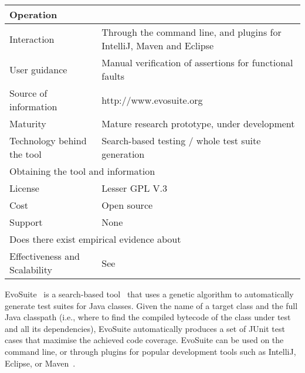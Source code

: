 \documentclass[10pt,conference]{IEEEtran}
\newcommand{\EVOSUITE}{{\sc EvoSuite}\xspace}
\begin{document}
\begin{table}[!h]
{\begin{tabular}{|l|p{5cm}|}
  \hline
  \multicolumn{2}{|l|}{Operation} \\
  \hline
  Interaction &  Through the command line, and plugins for IntelliJ, Maven and Eclipse\\
  User guidance &  Manual verification of assertions for functional faults\\
  Source of information &  http://www.evosuite.org \\
  Maturity&  Mature research prototype, under development\\
  Technology behind the tool & Search-based testing / whole test suite generation\\
\hline
  \multicolumn{2}{|l|}{Obtaining the tool and information} \\
  \hline
License & Lesser GPL V.3\\
Cost & Open source\\
Support & None \\
\hline
\hline
  \multicolumn{2}{|l|}{Does there exist empirical evidence about} \\
  \hline
  Effectiveness and Scalability & See~\cite{GoA_TSE12,fraser2014large} \\
\hline
\end{tabular}\vspace{-1em}
}
\end{table}


\EVOSUITE~\cite{FrA11c} is a search-based tool~\cite{GoA_TSE12} that
uses a genetic algorithm to automatically generate test suites for
Java classes. Given the name of a target class and the full Java
classpath (i.e., where to find the compiled bytecode of the class
under test and all its dependencies), \EVOSUITE automatically produces
a set of JUnit test cases that maximise the achieved code
coverage. \EVOSUITE can be used on the command line, or through
plugins for popular development tools such as IntelliJ, Eclipse, or Maven~\cite{ICST16_Tool}.
\end{document}
